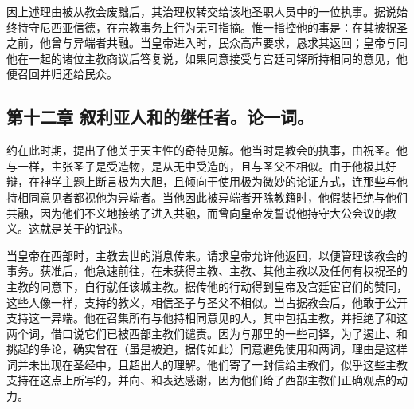 因上述理由被从教会废黜后，其治理权转交给该地圣职人员中的一位执事。据说始终持守尼西亚信德，在宗教事务上行为无可指摘。惟一指控他的事是：在其被祝圣之前，他曾与异端者共融。当皇帝进入时，民众高声要求，恳求其返回；皇帝与同他在一起的诸位主教商议后答复说，如果同意接受与宫廷司铎所持相同的意见，他便召回并归还给民众。\par


\subsection{第十二章 叙利亚人和的继任者。论一词。}

约在此时期，提出了他关于天主性的奇特见解。他当时是教会的执事，由祝圣。他与一样，主张圣子是受造物，是从无中受造的，且与圣父不相似。由于他极其好辩，在神学主题上断言极为大胆，且倾向于使用极为微妙的论证方式，连那些与他持相同意见者都视他为异端者。当他因此被异端者开除教籍时，他假装拒绝与他们共融，因为他们不义地接纳了进入共融，而曾向皇帝发誓说他持守大公会议的教义。这就是关于的记述。\par

当皇帝在西部时，主教去世的消息传来。请求皇帝允许他返回，以便管理该教会的事务。获准后，他急速前往，在未获得主教、主教、其他主教以及任何有权祝圣的主教的同意下，自行就任该城主教。据传他的行动得到皇帝及宫廷宦官们的赞同，这些人像一样，支持的教义，相信圣子与圣父不相似。当占据教会后，他敢于公开支持这一异端。他在召集所有与他持相同意见的人，其中包括主教，并拒绝了和这两个词，借口说它们已被西部主教们谴责。因为与那里的一些司铎，为了遏止、和挑起的争论，确实曾在（虽是被迫，据传如此）同意避免使用和两词，理由是这样词并未出现在圣经中，且超出人的理解。他们寄了一封信给主教们，似乎这些主教支持在这点上所写的，并向、和表达感谢，因为他们给了西部主教们正确观点的动力。\par

